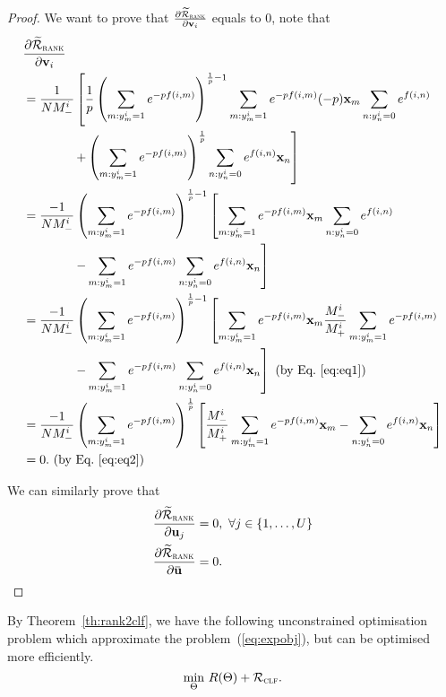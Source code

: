 \begin{proof}
We want to prove that
$\frac{\partial \widetilde{\mathcal{R}}_\textsc{rank}} {\partial \mathbf{v}_i}$ equals to $0$, note that
\begin{equation*}
\begin{aligned}
&\frac{\partial \widetilde{\mathcal{R}}_\textsc{rank}} {\partial \mathbf{v}_i} \\
&= \frac{1}{N M_-^i} \left[ \frac{1}{p} 
   \left( \sum_{m: y_m^i=1} e^{-p f(i, m)} \right)^{\frac{1}{p} - 1} \sum_{m: y_m^i=1} e^{-p f(i, m)} (-p) \mathbf{x}_m \sum_{n: y_n^i=0} e^{f(i, n)} \right. \\
& \hspace{4em} \left.
   + \left( \sum_{m: y_m^i = 1} e^{-p f(i, m)} \right)^\frac{1}{p} \sum_{n: y_n^i = 0} e^{f(i, n)} \mathbf{x}_n \right] \\
&= \frac{-1}{N M_-^i} \left( \sum_{m: y_m^i=1} e^{-p f(i, m)} \right)^{\frac{1}{p} - 1} 
   \left[ \sum_{m: y_m^i=1} e^{-p f(i, m)} \mathbf{x}_m \sum_{n: y_n^i=0} e^{f(i, n)} \right. \\
& \hspace{4em} \left.
   - \sum_{m: y_m^i = 1} e^{-p f(i, m)} \sum_{n: y_n^i = 0} e^{f(i, n)} \mathbf{x}_n \right] \\
&= \frac{-1}{N M_-^i} \left( \sum_{m: y_m^i=1} e^{-p f(i, m)} \right)^{\frac{1}{p} - 1} 
   \left[ \sum_{m: y_m^i=1} e^{-p f(i, m)} \mathbf{x}_m \frac{M_-^i}{M_+^i} \sum_{m: y_m^i=1} e^{-p f(i, m)} \right. \\
& \hspace{4em} \left.
   - \sum_{m: y_m^i = 1} e^{-p f(i, m)} \sum_{n: y_n^i = 0} e^{f(i, n)} \mathbf{x}_n \right] \ \text{(by Eq.~\ref{eq:eq1})} \\
&= \frac{-1}{N M_-^i} \left( \sum_{m: y_m^i=1} e^{-p f(i, m)} \right)^\frac{1}{p} 
   \left[ \frac{M_-^i}{M_+^i} \sum_{m: y_m^i=1} e^{-p f(i, m)} \mathbf{x}_m - \sum_{n: y_n^i = 0} e^{f(i, n)} \mathbf{x}_n \right] \\
&= 0. \ \text{(by Eq.~\ref{eq:eq2})}
\end{aligned}
\end{equation*}

We can similarly prove that 
\begin{equation*}
\begin{aligned}
\frac{\partial \widetilde\RCal_\textsc{rank}}{\partial \bu_j} &= 0, \ \forall j \in \{1,\dots,U\} \\
\frac{\partial \widetilde\RCal_\textsc{rank}}{\partial \widebar{\bu}} &= 0.
\end{aligned}
\end{equation*}

\end{proof}

By Theorem~\ref{th:rank2clf}, we have the following unconstrained optimisation problem
which approximate the problem~(\ref{eq:expobj}),
but can be optimised more efficiently.
\begin{equation}
\label{eq:expobj_clf}
\min_{\Theta} \, R(\Theta) + \mathcal{R}_\textsc{clf}.
\end{equation}

